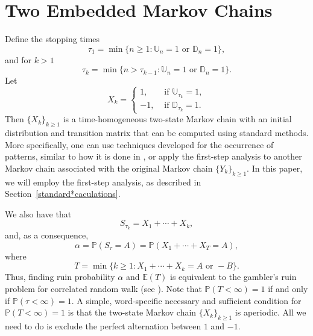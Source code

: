 \documentclass{amsart}
\newcommand{\PP}{{\mathbb{P}}}
\newcommand{\EE}{{\mathbb{E}}}
\newcommand{\U}{{\mathbb{U}}}
\newcommand{\D}{{\mathbb{D}}}
\newcommand{\1}{{\mathbf{1}}}
\begin{document}
\section{Two Embedded Markov Chains}\label{embedded*mc*section}

Define the stopping times
\begin{equation*}\label{first*word*stopping*time}
\tau_1=\min\{n\geq 1: \U_n=1 \mbox{ or } \D_n =1\},
\end{equation*}
and for $k>1$
\begin{equation*}\label{k*word*stopping*time}
\tau_k=\min\{n>\tau_{k-1}: \U_n=1 \mbox{ or } \D_n =1\}.
\end{equation*}
Let
$$
X_k=\left\{\begin{array}{rl}
             1,& \mbox{ if }  \U_{\tau_k}=1, \\
             -1,& \mbox{ if } \D_{\tau_k}=1.
           \end{array}
\right.
$$
Then $\{X_k\}_{k\geq 1}$ is a time-homogeneous two-state Markov chain with an initial
distribution and transition matrix that can be computed using standard methods.
More specifically, one can use techniques developed for the occurrence of patterns,
similar to how it is done in \cite{Pozdnyakov2025}, or apply the first-step analysis
to another Markov chain associated with the original Markov chain $\{Y_k\}_{k\geq 1}$.
In this paper, we will employ the first-step analysis, as described
in Section~\ref{standard*caculations}.


We also have that
$$S_{\tau_k}=X_1+\cdots+X_k,$$
and, as a consequence, $$\alpha=\PP(S_\tau=A)=\PP(X_1+\cdots+X_T=A),$$
where
$$T=\min\{k\geq 1: X_1+\cdots+X_k=A\mbox{ or }-B\}.$$ Thus, finding ruin
probability $\alpha$ and $\EE(T)$ is equivalent to the gambler's ruin problem
for correlated random walk (see \cite{Mohan1955}). {Note that $\PP(T < \infty) = 1$
if and only if $\PP(\tau < \infty) = 1$. A simple, word-specific necessary and
sufficient condition for $\PP(T < \infty) = 1$ is that the two-state
Markov chain $\{X_k\}_{k \geq 1}$ is aperiodic. All we need to do is exclude the
perfect alternation between $1$ and $-1$.}
\end{document}
